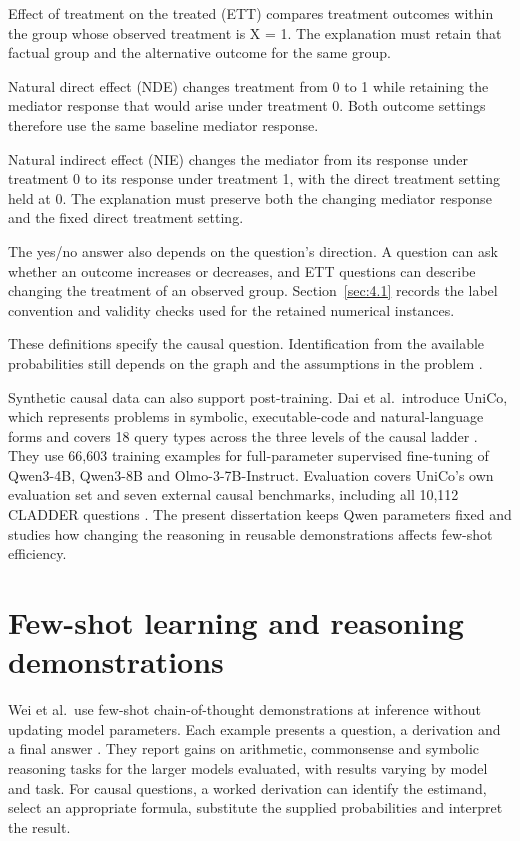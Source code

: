 Effect of treatment on the treated (ETT) compares treatment outcomes within the group whose observed treatment is X = 1. The explanation must retain that factual group and the alternative outcome for the same group.

Natural direct effect (NDE) changes treatment from 0 to 1 while retaining the mediator response that would arise under treatment 0. Both outcome settings therefore use the same baseline mediator response.

Natural indirect effect (NIE) changes the mediator from its response under treatment 0 to its response under treatment 1, with the direct treatment setting held at 0. The explanation must preserve both the changing mediator response and the fixed direct treatment setting.

The yes/no answer also depends on the question's direction. A question can ask whether an outcome increases or decreases, and ETT questions can describe changing the treatment of an observed group. Section~\ref{sec:4.1} records the label convention and validity checks used for the retained numerical instances.

These definitions specify the causal question. Identification from the available probabilities still depends on the graph and the assumptions in the problem \cite{Pearl_2009,NEURIPS2023_631bb943}.

Synthetic causal data can also support post-training. Dai et al.\ introduce UniCo, which represents problems in symbolic, executable-code and natural-language forms and covers 18 query types across the three levels of the causal ladder \cite{dai2026universalcausalreasoner}. They use 66,603 training examples for full-parameter supervised fine-tuning of Qwen3-4B, Qwen3-8B and Olmo-3-7B-Instruct. Evaluation covers UniCo's own evaluation set and seven external causal benchmarks, including all 10,112 CLADDER questions \cite{dai2026universalcausalreasoner}. The present dissertation keeps Qwen parameters fixed and studies how changing the reasoning in reusable demonstrations affects few-shot efficiency.

\section{Few-shot learning and reasoning demonstrations}\label{sec:2.2}

Wei et al.\ use few-shot chain-of-thought demonstrations at inference without updating model parameters. Each example presents a question, a derivation and a final answer \cite{NEURIPS2022_9d560961}. They report gains on arithmetic, commonsense and symbolic reasoning tasks for the larger models evaluated, with results varying by model and task. For causal questions, a worked derivation can identify the estimand, select an appropriate formula, substitute the supplied probabilities and interpret the result.


